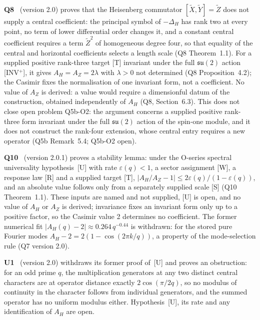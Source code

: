 \documentclass[11pt,a4paper]{article}
\theoremstyle{definition}
\newcommand{\su}{\mathfrak{su}}
\newcommand{\AH}{A_H}
\newcommand{\AZ}{A_Z}
\begin{document}
      \textbf{Q8}~\cite{BeauQ8} (version 2.0) proves that the Heisenberg commutator
      $[\tilde{X}, \tilde{Y}] = \tilde{Z}$ does not supply a central coefficient: the principal
      symbol of $-\Delta_H$ has rank two at every point, no term of lower differential order
      changes it, and a constant central coefficient requires a term $\tilde{Z}^2$ of homogeneous
      degree four, so that equality of the central and horizontal coefficients selects a length
      scale (Q8 Theorem~1.1).
      For a supplied positive rank-three target [T] invariant under the full $\su(2)$ action
      [INV$^+$], it gives $\AH = \AZ = 2\lambda$ with $\lambda > 0$ not determined (Q8
      Proposition~4.2); the Casimir fixes the normalisation of one invariant form, not a
      coefficient.
      No value of $\AZ$ is derived: a value would require a dimensionful datum of the
      construction, obtained independently of $\AH$ (Q8, Section~6.3).
      This does not close open problem Q5b-O2: the argument concerns a supplied positive
      rank-three form invariant under the full $\su(2)$ action of the spin-one module, and it
      does not construct the rank-four extension, whose central entry requires a new operator
      (Q5b Remark~5.4; Q5b-O2 open).

      \textbf{Q10}~\cite{Beau2026q10} (version 2.0.1) proves a stability lemma: under the O-series
      spectral universality hypothesis~[U] with rate $\varepsilon(q) < 1$, a sector assignment
      [W], a response law [R] and a supplied target [T],
      $|\AH/\AZ - 1| \leq 2\varepsilon(q)/(1 - \varepsilon(q))$, and an absolute value follows
      only from a separately supplied scale [S] (Q10 Theorem~1.1).
      These inputs are named and not supplied, [U] is open, and no value of $\AH$ or $\AZ$ is
      derived; invariance fixes an invariant form only up to a positive factor, so the Casimir
      value 2 determines no coefficient.
      The former numerical fit $|A_H(q) - 2| \approx 0.264\,q^{-0.44}$ is withdrawn: for the
      stored pure Fourier modes $A_H - 2 = 2(1 - \cos(2\pi k/q))$, a property of the
      mode-selection rule (Q7 version 2.0).

      \textbf{U1}~\cite{Beau2026u1} (version 2.0) withdraws its former proof of~[U] and proves an
      obstruction: for an odd prime $q$, the multiplication generators at any two distinct
      central characters are at operator distance exactly $2\cos(\pi/2q)$, so no modulus of
      continuity in the character follows from individual generators, and the summed operator
      has no uniform modulus either.
      Hypothesis~[U], its rate and any identification of $\AH$ are open.
\end{document}
